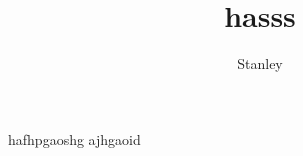 \documentclass[10pt,a4paper]{article}
\author{Stanley}
\title{hasss}
\begin{document}
hafhpgaoshg ajhgaoid \cite{food2011drug}



\end{document}
